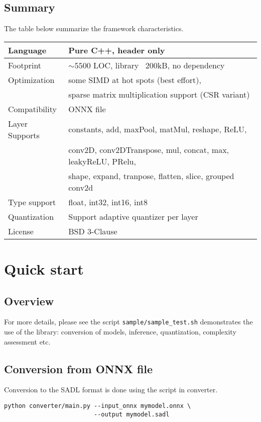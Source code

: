 \documentclass[10pt,a4paper]{article}
\begin{document}
\subsection{Summary}
The table below summarize the framework characteristics.
\begin{table}[]
\begin{tabular}{|l|l|}
\hline
Language & Pure C++, header only \\
\hline
Footprint & $\sim 5500$ LOC, library ~200kB, no dependency\\
\hline
Optimization & some SIMD at hot spots (best effort), \\
& sparse matrix multiplication support (CSR variant)\\
\hline
Compatibility & ONNX file\\
\hline
Layer Supports & constants, add, maxPool, matMul, reshape, ReLU, \\
& conv2D, conv2DTranspose, mul, concat, max, leakyReLU, PRelu, \\
& shape, expand, tranpose, flatten, slice, grouped conv2d  \\
\hline
Type support & float, int32, int16, int8\\
\hline
Quantization & Support adaptive quantizer per layer\\
\hline
License & BSD 3-Clause \\
\hline
\end{tabular}
\end{table}


\section{Quick start}

\subsection{Overview}
For more details, please see the script \texttt{sample/sample\_test.sh} demonstrates the use of the library: conversion of models, inference, quantization, complexity assessment etc.


\subsection{Conversion from ONNX file}
Conversion to the SADL format is done using the script in converter.
\begin{lstlisting}[caption={SADL format conversion},style=code]
python converter/main.py --input_onnx mymodel.onnx \
                         --output mymodel.sadl
\end{lstlisting}
\end{document}
